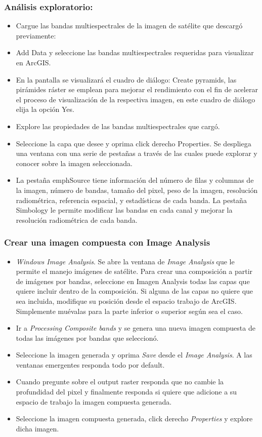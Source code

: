 \documentclass[a4paper,oneside,11pt,]{article}
\begin{document}
\subsubsection{Análisis exploratorio:}
\begin{itemize}
\item Cargue las bandas multiespectrales de la imagen de satélite que descargó previamente: 
\item Add Data y seleccione las bandas multiespectrales requeridas para visualizar en ArcGIS.
\item En la pantalla se visualizará el cuadro de diálogo: Create pyramids, las pirámides ráster se emplean para mejorar el rendimiento con el fin de acelerar el proceso de visualización de la respectiva imagen, en este cuadro de diálogo elija la opción Yes.
\item Explore las propiedades de las bandas multiespectrales que cargó. 
\item Seleccione la capa que desee y oprima click derecho Properties. Se despliega una ventana con una serie de pestañas a través de las cuales puede explorar y conocer sobre  la imagen seleccionada. 
\item La pestaña emph{Source} tiene información del número de filas y columnas de la imagen, número de bandas, tamaño del pixel, peso de la imagen, resolución radiométrica, referencia espacial, y estadísticas de cada banda. La pestaña Simbology le permite modificar las bandas en cada canal y mejorar la resolución radiométrica  de cada banda.
\end{itemize}

\subsubsection{Crear una imagen compuesta con Image Analysis}
\begin{itemize}
\item \emph{Windows Image Analysis}. Se abre la ventana de \emph{Image Analysis} que le permite el manejo imágenes de satélite. Para crear una composición a partir de imágenes por bandas, seleccione en Imagen Analysis  todas las capas que quiere incluir dentro de la composición. Si alguna de las capas no quiere que sea incluida, modifique su posición desde el espacio trabajo de ArcGIS. Simplemente muévalas para la parte inferior o superior según sea el caso.
\item Ir a \emph{Processing  Composite bands} y se genera una nueva imagen compuesta de todas las imágenes por bandas que seleccionó. 
\item Seleccione la imagen generada y oprima \emph{Save} desde el \emph{Image Analysis}. A las ventanas emergentes responda todo por default. 
\item Cuando pregunte sobre el output raster responda que no cambie la profundidad del pixel y finalmente responda si quiere que adicione a su espacio de trabajo la imagen compuesta generada.
\item Seleccione la imagen compuesta generada, click derecho  \emph{Properties}  y explore dicha imagen.
\end{itemize}
\end{document}

